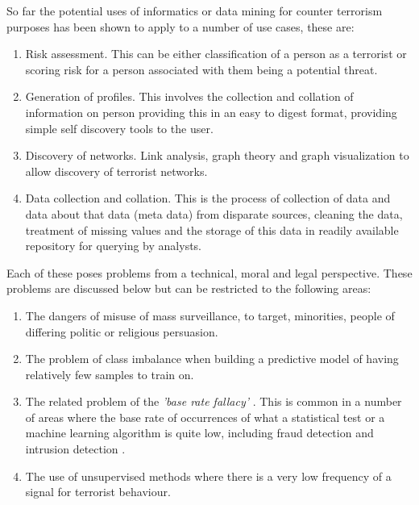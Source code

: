 So far the potential uses of informatics or data mining for counter terrorism purposes has been shown to apply to a number of use cases, these are:
\begin{enumerate}
\item Risk assessment. This can be either classification of a person as a terrorist or scoring risk for a person associated with them being a potential threat.
\item Generation of profiles. This involves the collection and collation of information on person providing this in an easy to digest format, providing simple self discovery tools to the user.
\item Discovery of networks. Link analysis, graph theory and graph visualization to allow discovery of terrorist networks.
\item Data collection and collation. This is the process of collection of data and data about that data (meta data) from disparate sources, cleaning the data, treatment of missing values and the storage of this data in readily available repository for querying by analysts.
\end{enumerate}

Each of these poses problems from a technical, moral and legal perspective. These problems are discussed below but can be restricted to the following areas:
\begin{enumerate}
\item The dangers of misuse of mass surveillance, to target, minorities, people of differing politic or religious persuasion.
\item The problem of class imbalance when building a predictive model of having relatively few samples to train on.
\item The related problem of the \textit{'base rate fallacy'} \citep{bar1980base}. This is common in a number of areas where the base rate of occurrences of what a statistical test or a machine learning algorithm is quite low, including fraud detection and intrusion detection \citep{axelsson2000base}.
\item The use of unsupervised methods where there is a very low frequency of a signal for terrorist behaviour.
\end{enumerate}

